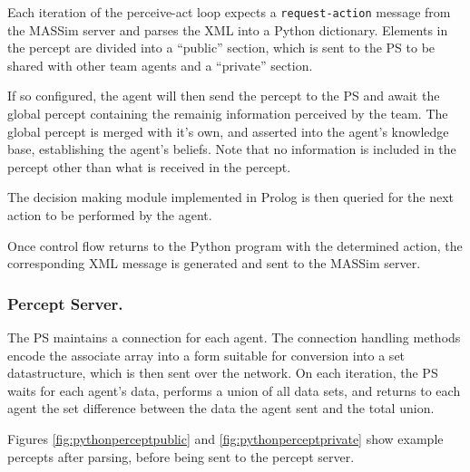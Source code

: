     Each iteration of the perceive-act loop expects a \texttt{request-action}
    message from the MASSim server and parses the XML into a Python dictionary.
    Elements in the percept are divided into a ``public'' section, which is sent
    to the PS to be shared with other team agents and a ``private''
    section.

    If so configured, the agent will then send the percept to the PS and await
    the global percept containing the remainig information perceived by the
    team. The global percept is merged with it's own, and asserted into the
    agent's knowledge base, establishing the agent's beliefs.  Note that no
    information is included in the percept other than what is received in the
    percept.

    The decision making module implemented in Prolog is then queried for the
    next action to be performed by the agent.
    
    Once control flow returns to the Python program with the determined action,
    the corresponding XML message is generated and sent to the MASSim server. 

\subsubsection{Percept Server.}
    The PS maintains a connection for each agent. 
    The connection handling methods encode the associate array into a form
    suitable for conversion into a set datastructure, which is then sent over
    the network. 
    On each iteration, the PS waits for each agent's data, performs a union of
    all data sets, and returns to each agent the set difference between the data
    the agent sent and the total union.

    Figures \ref{fig:pythonperceptpublic} and \ref{fig:pythonperceptprivate}
    show example percepts after parsing, before being sent to the percept
    server.

